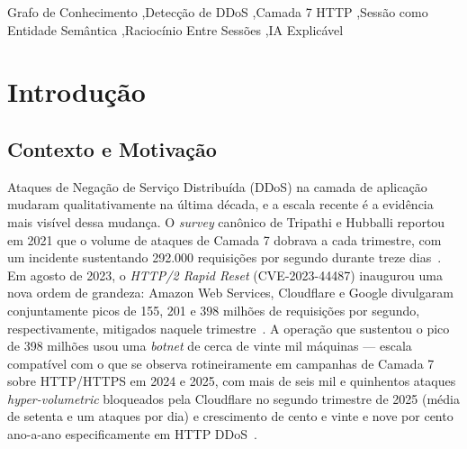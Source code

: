 \documentclass[preprint,12pt]{elsarticle}
\begin{document}
\begin{frontmatter}
\begin{abstract}
\end{abstract}

\begin{keyword}
Grafo de Conhecimento \sep Detecção de DDoS \sep Camada 7 HTTP \sep Sessão como Entidade Semântica \sep Raciocínio Entre Sessões \sep IA Explicável
\end{keyword}

\end{frontmatter}


\section{Introdução}
\label{sec:introduction}

\subsection{Contexto e Motivação}

Ataques de Negação de Serviço Distribuída (DDoS) na camada de aplicação mudaram qualitativamente na última década, e a escala recente é a evidência mais visível dessa mudança. O \emph{survey} canônico de Tripathi e Hubballi reportou em 2021 que o volume de ataques de Camada 7 dobrava a cada trimestre, com um incidente sustentando 292.000 requisições por segundo durante treze dias~\cite{tripathi2021application}. Em agosto de 2023, o \emph{HTTP/2 Rapid Reset} (CVE-2023-44487) inaugurou uma nova ordem de grandeza: Amazon Web Services, Cloudflare e Google divulgaram conjuntamente picos de 155, 201 e 398 milhões de requisições por segundo, respectivamente, mitigados naquele trimestre~\cite{cloudflare2023rapidreset,google2023rapidreset,cve202344487}. A operação que sustentou o pico de 398 milhões usou uma \emph{botnet} de cerca de vinte mil máquinas --- escala compatível com o que se observa rotineiramente em campanhas de Camada 7 sobre HTTP/HTTPS em 2024 e 2025, com mais de seis mil e quinhentos ataques \emph{hyper-volumetric} bloqueados pela Cloudflare no segundo trimestre de 2025 (média de setenta e um ataques por dia) e crescimento de cento e vinte e nove por cento ano-a-ano especificamente em HTTP DDoS~\cite{cloudflare2025q2ddos,cloudflare2025q1ddos}.
\end{document}

